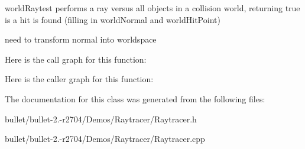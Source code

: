 world\+Raytest performs a ray versus all objects in a collision world, returning true is a hit is found (filling in world\+Normal and world\+Hit\+Point) 

need to transform normal into worldspace 

Here is the call graph for this function\+:




Here is the caller graph for this function\+:




The documentation for this class was generated from the following files\+:\begin{DoxyCompactItemize}
\item 
bullet/bullet-\/2.-\/r2704/\+Demos/\+Raytracer/Raytracer.\+h\item 
bullet/bullet-\/2.-\/r2704/\+Demos/\+Raytracer/Raytracer.\+cpp\end{DoxyCompactItemize}
